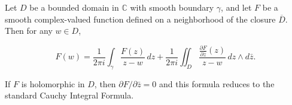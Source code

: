 Let $D$ be a bounded domain in $\mathbb{C}$ with smooth boundary $\gamma$, and let $F$ be a smooth complex-valued function defined on a neighborhood of the closure $\overline{D}$. Then for any $w \in D$,

$$F(w) = \frac{1}{2\pi i} \int_{\gamma} \frac{F(z)}{z - w}\, dz + \frac{1}{2\pi i} \iint_D \frac{\frac{\partial F}{\partial \bar{z}}(z)}{z - w}\, dz \wedge d\bar{z}.$$

If $F$ is holomorphic in $D$, then $\partial F / \partial \bar{z} = 0$ and this formula reduces to the standard Cauchy Integral Formula.
